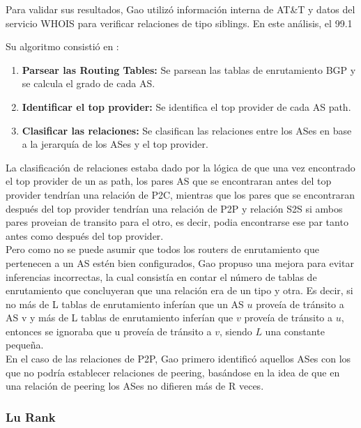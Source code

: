 Para validar sus resultados, Gao utilizó información interna de AT\&T y datos del servicio WHOIS para verificar relaciones de tipo siblings. En este análisis, el 99.1%



Su algoritmo consistió en :
\begin{enumerate}
    \item \textbf{Parsear las Routing Tables:} Se parsean las tablas de enrutamiento BGP y se calcula el grado de cada AS.
    \item \textbf{Identificar el top provider:} Se identifica el top provider de cada AS path.
    \item \textbf{Clasificar las relaciones:} Se clasifican las relaciones entre los ASes en base a la jerarquía de los ASes y el top provider.
\end{enumerate}

La clasificación de relaciones estaba dado por la lógica de que una vez encontrado el top provider de un as path, los pares AS que se encontraran antes del top provider tendrían una relación de P2C, mientras que los pares que se encontraran después del top provider tendrían una relación de P2P y relación S2S si ambos pares proveian de transito para el otro, es decir, podia encontrarse ese par tanto antes como después del top provider.\\

Pero como no se puede asumir que todos los routers de enrutamiento que pertenecen a un AS estén bien configurados, Gao propuso una mejora para evitar inferencias incorrectas, la cual consistía en contar el número de tablas de enrutamiento que concluyeran que una relación era de un tipo y otra. Es decir, si no más de L tablas de enrutamiento inferían que un AS $u$ proveía de tránsito a AS v y más de L tablas de enrutamiento inferían que $v$ proveía de tránsito a $u$, entonces se ignoraba que u proveía de tránsito a $v$, siendo $L$ una constante pequeña.\\

En el caso de las relaciones de P2P, Gao primero identificó aquellos ASes con los que no podría establecer relaciones de peering, basándose en la idea de que en una relación de peering los ASes no difieren más de R veces.\\



\subsubsection{Lu Rank} \label{sec:anexo_lurank}


